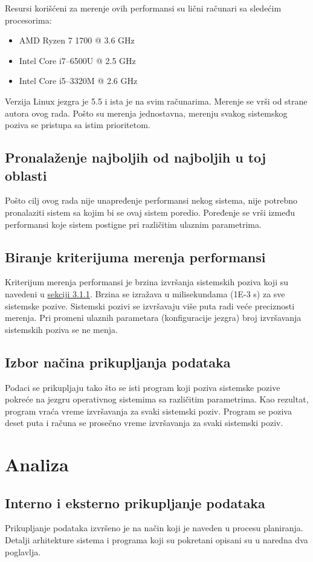 \documentclass[12pt]{report}
\begin{document}
Resursi korišćeni za merenje ovih performansi su lični računari sa sledećim procesorima:
\begin{itemize}
    \item AMD Ryzen 7 1700 @ 3.6 GHz
    \item Intel Core i7--6500U @ 2.5 GHz
    \item Intel Core i5--3320M @ 2.6 GHz
\end{itemize}

Verzija Linux jezgra je 5.5 i ista je na svim računarima. Merenje se vrši od strane autora ovog rada. Pošto su merenja jednostavna, merenju svakog sistemskog poziva se pristupa sa istim prioritetom.

\subsection{Pronalaženje najboljih od najboljih u toj oblasti}
Pošto cilj ovog rada nije unapređenje performansi nekog sistema, nije potrebno pronalaziti sistem sa kojim bi se ovaj sistem poredio. Poređenje se vrši između performansi koje sistem postigne pri različitim ulaznim parametrima.

\subsection{Biranje kriterijuma merenja performansi}
Kriterijum merenja performansi je brzina izvršanja sistemskih poziva koji su navedeni u \hyperref[identifikacija_funkcionalnosti]{sekciji 3.1.1}. Brzina se izražava u milisekundama (1E-3 s) za sve sistemske pozive. Sistemski pozivi se izvršavaju više puta radi veće preciznosti merenja. Pri promeni ulaznih parametara (konfiguracije jezgra) broj izvršavanja sistemskih poziva se ne menja.

\subsection{Izbor načina prikupljanja podataka}
Podaci se prikupljaju tako što se isti program koji poziva sistemske pozive pokreće na jezgru operativnog sistemima sa različitim parametrima. Kao rezultat, program vraća vreme izvršavanja za svaki sistemski poziv. Program se poziva deset puta i računa se prosečno vreme izvršavanja za svaki sistemski poziv.

\section{Analiza}
\subsection{Interno i eksterno prikupljanje podataka}
Prikupljanje podataka izvršeno je na način koji je naveden u procesu planiranja. Detalji arhitekture sistema i programa koji su pokretani opisani su u naredna dva poglavlja.
\end{document}
